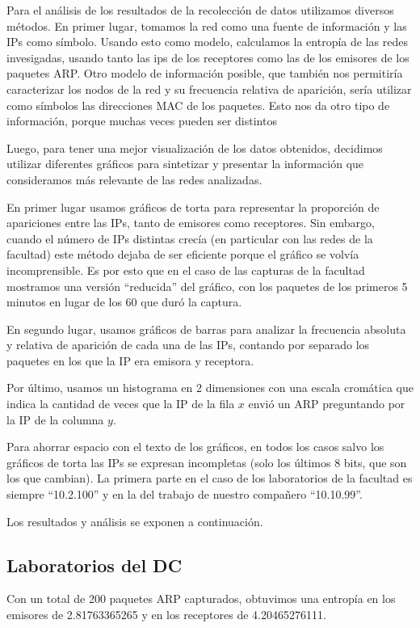 Para el análisis de los resultados de la recolección de datos utilizamos
diversos métodos. En primer lugar, tomamos la red como una fuente de
información y las IPs como símbolo. Usando esto como modelo, calculamos la
entropía de las redes invesigadas, usando tanto las ips de los receptores como
las de los emisores de los paquetes ARP. Otro modelo de información posible,
que también nos permitiría caracterizar los nodos de la red y su frecuencia
relativa de aparición, sería utilizar como símbolos las direcciones MAC de los
paquetes. Esto nos da otro tipo de información, porque muchas veces pueden ser
distintos 

Luego, para tener una mejor visualización de los datos obtenidos, decidimos
utilizar diferentes gráficos para sintetizar y presentar la información que
consideramos más relevante de las redes analizadas.

En primer lugar usamos gráficos de torta para representar la proporción de
apariciones entre las IPs, tanto de emisores como receptores. Sin embargo,
cuando el número de IPs distintas crecía (en particular con las redes de la
facultad) este método dejaba de ser eficiente porque el gráfico se volvía
incomprensible. Es por esto que en el caso de las capturas de la facultad
mostramos una versión ``reducida'' del gráfico, con los paquetes de los
primeros 5 minutos en lugar de los 60 que duró la captura.

En segundo lugar, usamos gráficos de barras para analizar la frecuencia
absoluta y relativa de aparición de cada una de las IPs, contando por separado
los paquetes en los que la IP era emisora y receptora.

Por último, usamos un histograma en 2 dimensiones con una escala cromática
que indica la cantidad de veces que la IP de la fila $x$ envió un ARP
preguntando por la IP de la columna $y$.

Para ahorrar espacio con el texto de los gráficos, en todos los casos salvo los
gráficos de torta las IPs se expresan incompletas (solo los últimos 8 bits, que
son los que cambian). La primera parte en el caso de los laboratorios de la
facultad es siempre ``10.2.100'' y en la del trabajo de nuestro compañero
``10.10.99''.

Los resultados y análisis se exponen a continuación.

\subsection{Laboratorios del DC}
Con un total de 200 paquetes ARP capturados, obtuvimos una entropía en los
emisores de 2.81763365265 y en los receptores de 4.20465276111.

